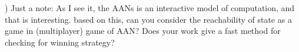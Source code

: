 \documentclass[11pt]{article}
\newcommand{\ilanswer}[1]{\textcolor{blue}{#1}}
\begin{document}
\medskip

) Just a note: As I see it, the AANs is an interactive model of computation, and that is interesting. based on this, can you consider the reachability of state as a game in (multiplayer) game of AAN? Does  your work give a fast method for checking for winning strategy?   

\end{document}

